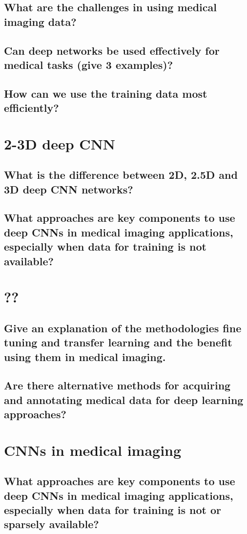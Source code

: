 \subsection{What are the challenges in using medical imaging data?}
\subsection{Can deep networks be used effectively for medical tasks (give 3 examples)?}
\subsection{How can we use the training data most efficiently?}

\section{2-3D deep CNN}
\subsection{What is the difference between 2D, 2.5D and 3D deep CNN networks?}
\subsection{What approaches are key components to use deep CNNs in medical imaging applications, especially when data for training is not available?}

\section{??}
\subsection{Give an explanation of the methodologies fine tuning and transfer learning and the benefit using them in medical imaging. }
\subsection{Are there alternative methods for acquiring and annotating medical data for deep learning approaches?}

\section{CNNs in medical imaging}
\subsection{What approaches are key components to use deep CNNs in medical imaging applications, especially when data for training is not or sparsely available?}
